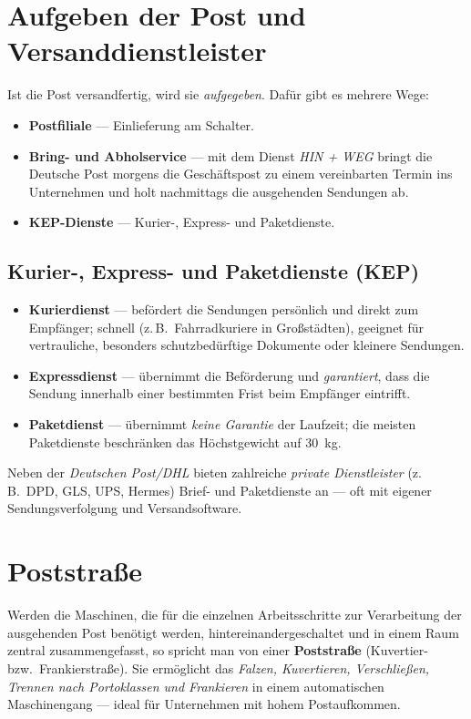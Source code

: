 \documentclass[11pt, a4paper]{article}
\begin{document}
\section{Aufgeben der Post und Versanddienstleister}

Ist die Post versandfertig, wird sie \emph{aufgegeben}. Dafür gibt es mehrere Wege:

\begin{itemize}
  \item \textbf{Postfiliale} --- Einlieferung am Schalter.
  \item \textbf{Bring- und Abholservice} --- mit dem Dienst \emph{HIN + WEG} bringt die Deutsche Post morgens die Geschäftspost zu einem vereinbarten Termin ins Unternehmen und holt nachmittags die ausgehenden Sendungen ab.
  \item \textbf{KEP-Dienste} --- Kurier-, Express- und Paketdienste.
\end{itemize}

\subsection{Kurier-, Express- und Paketdienste (KEP)}

\begin{itemize}
  \item \textbf{Kurierdienst} --- befördert die Sendungen persönlich und direkt zum Empfänger; schnell (z.\,B.\ Fahrradkuriere in Großstädten), geeignet für vertrauliche, besonders schutzbedürftige Dokumente oder kleinere Sendungen.
  \item \textbf{Expressdienst} --- übernimmt die Beförderung und \emph{garantiert}, dass die Sendung innerhalb einer bestimmten Frist beim Empfänger eintrifft.
  \item \textbf{Paketdienst} --- übernimmt \emph{keine Garantie} der Laufzeit; die meisten Paketdienste beschränken das Höchstgewicht auf 30~kg.
\end{itemize}

Neben der \emph{Deutschen Post/DHL} bieten zahlreiche \emph{private Dienstleister}
(z.\,B.\ DPD, GLS, UPS, Hermes) Brief- und Paketdienste an --- oft mit eigener
Sendungsverfolgung und Versandsoftware.

\section{Poststraße}

Werden die Maschinen, die für die einzelnen Arbeitsschritte zur Verarbeitung der
ausgehenden Post benötigt werden, hintereinandergeschaltet und in einem Raum zentral
zusammengefasst, so spricht man von einer \textbf{Poststraße} (Kuvertier- bzw.\
Frankierstraße). Sie ermöglicht das \emph{Falzen, Kuvertieren, Verschließen, Trennen nach
Portoklassen und Frankieren} in einem automatischen Maschinengang --- ideal für
Unternehmen mit hohem Postaufkommen.
\end{document}

